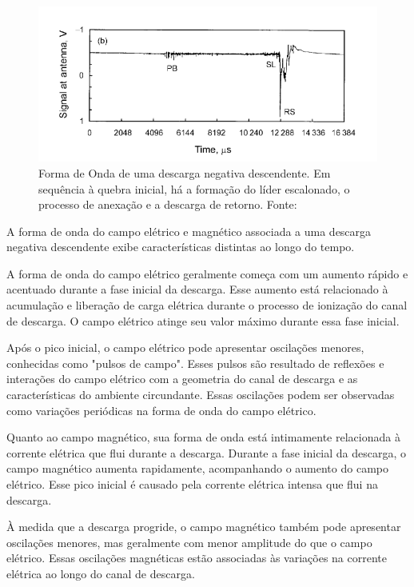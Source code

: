 \documentclass[a4paper, 12pt, onecolumn,singlespacing]{article}
\begin{document}
	\begin{figure}[!h]
		\centering
		\includegraphics[scale=1.9]{imagens/initial_breakdown.png}
		\caption{Forma de Onda de uma descarga negativa descendente. Em sequência à quebra inicial, há a formação do líder escalonado, o processo de anexação e a descarga de retorno. Fonte: \cite{RAKOV_UHMAN}}
		\label{initial_breakdown}
	\end{figure}
	
	A forma de onda do campo elétrico e magnético associada a uma descarga negativa descendente exibe características distintas ao longo do tempo.
	
	A forma de onda do campo elétrico geralmente começa com um aumento rápido e acentuado durante a fase inicial da descarga. Esse aumento está relacionado à acumulação e liberação de carga elétrica durante o processo de ionização do canal de descarga. O campo elétrico atinge seu valor máximo durante essa fase inicial.
	
	Após o pico inicial, o campo elétrico pode apresentar oscilações menores, conhecidas como "pulsos de campo". Esses pulsos são resultado de reflexões e interações do campo elétrico com a geometria do canal de descarga e as características do ambiente circundante. Essas oscilações podem ser observadas como variações periódicas na forma de onda do campo elétrico.
	
	Quanto ao campo magnético, sua forma de onda está intimamente relacionada à corrente elétrica que flui durante a descarga. Durante a fase inicial da descarga, o campo magnético aumenta rapidamente, acompanhando o aumento do campo elétrico. Esse pico inicial é causado pela corrente elétrica intensa que flui na descarga.
	
	À medida que a descarga progride, o campo magnético também pode apresentar oscilações menores, mas geralmente com menor amplitude do que o campo elétrico. Essas oscilações magnéticas estão associadas às variações na corrente elétrica ao longo do canal de descarga.
	
\end{document}
